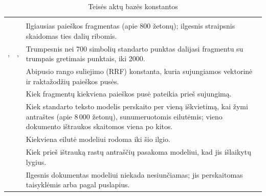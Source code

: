 \begin{xltabular}{\textwidth}{@{}L{44mm}L{19mm}Y@{}}
\caption{Teisės aktų bazės konstantos}\label{tab:config:corpus}\\
\toprule
{} &  &  \\
\midrule
\endfirsthead
\toprule
{} &  &  \\
\midrule
\endhead
\bottomrule
\endlastfoot
{} &  & Ilgiausias paieškos fragmentas (apie 800 žetonų); ilgesnis straipsnis skaidomas ties dalių ribomis. \\
,  & ,  & Trumpesnis nei 700 simbolių standarto punktas dalijasi fragmentu su trumpais gretimais punktais, iki 2000. \\
 &  & Abipusio rango suliejimo (RRF) konstanta, kuria sujungiamos vektorinė ir raktažodžių paieškos pusės. \\
 &  & Kiek fragmentų kiekviena paieškos pusė pateikia prieš sujungimą. \\
 &  & Kiek standarto teksto modelis perskaito per vieną iškvietimą, kai žymi antraštes (apie 8\,000 žetonų), sunumeruotomis eilutėmis; vieno dokumento ištraukos skaitomos viena po kitos. \\
 &  & Kiekviena eilutė modeliui rodoma iki šio ilgio. \\
 &  & Kiek prieš ištrauką rastų antraščių pasakoma modeliui, kad jis išlaikytų lygius. \\
 &  & Ilgesnis dokumentas modeliui niekada nesiunčiamas; jis perskaitomas taisyklėmis arba pagal puslapius. \\

\end{xltabular}
